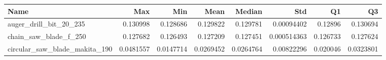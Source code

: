 \begin{tabular}{lrrrrrrr}
\hline
 Name                          &       Max &       Min &      Mean &    Median &         Std &       Q1 &        Q3 \\
\hline
 auger\_drill\_bit\_20\_235        & 0.130998  & 0.128686  & 0.129822  & 0.129781  & 0.00094402  & 0.12896  & 0.130694  \\
 chain\_saw\_blade\_f\_250         & 0.127682  & 0.126493  & 0.127209  & 0.127451  & 0.000514363 & 0.126733 & 0.127624  \\
 circular\_saw\_blade\_makita\_190 & 0.0481557 & 0.0147714 & 0.0269452 & 0.0264764 & 0.00822296  & 0.020046 & 0.0323801 \\
\hline
\end{tabular}
